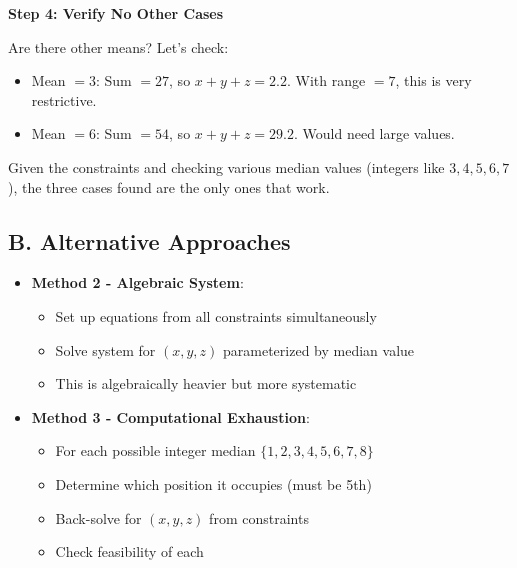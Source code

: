 \documentclass[11pt]{article}
\begin{document}
\begin{solutionbox}
\textbf{Step 4: Verify No Other Cases}

Are there other means? Let's check:
\begin{itemize}
    \item Mean $= 3$: Sum $= 27$, so $x + y + z = 2.2$. With range $= 7$, this is very restrictive.
    \item Mean $= 6$: Sum $= 54$, so $x + y + z = 29.2$. Would need large values.
\end{itemize}

Given the constraints and checking various median values (integers like $3, 4, 5, 6, 7$), the three cases found are the only ones that work.

\subsection*{B. Alternative Approaches}
\begin{itemize}[leftmargin=*]
    \item \textbf{Method 2 - Algebraic System}: 
    \begin{itemize}
        \item Set up equations from all constraints simultaneously
        \item Solve system for $(x, y, z)$ parameterized by median value
        \item This is algebraically heavier but more systematic
    \end{itemize}
    
    \item \textbf{Method 3 - Computational Exhaustion}:
    \begin{itemize}
        \item For each possible integer median $\{1, 2, 3, 4, 5, 6, 7, 8\}$
        \item Determine which position it occupies (must be 5th)
        \item Back-solve for $(x, y, z)$ from constraints
        \item Check feasibility of each
    \end{itemize}
\end{itemize}
\end{solutionbox}
\end{document}
